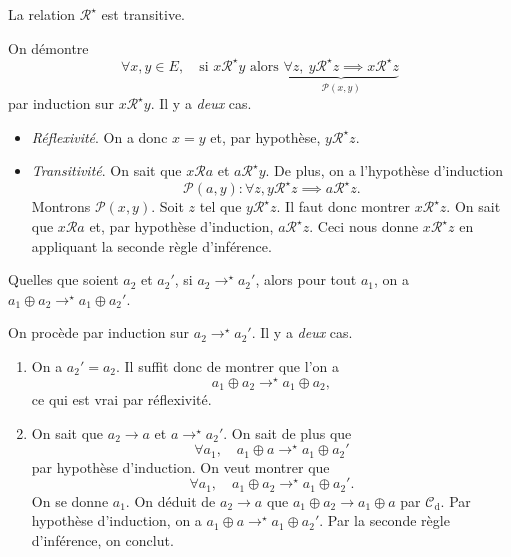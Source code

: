 \documentclass[../main]{subfiles}
\begin{document}
  \begin{lem}\label{lem:petit-pas-trans-transitif}
    La relation $\mathcal{R}^\star$ est transitive.
  \end{lem}
  \begin{prv}
    On démontre \[
      \forall x,y \in E, \quad \text{si } x \mathrel{\mathcal{R}^\star} y \text{ alors } \underbrace{\forall z, \ y \mathrel{\mathcal{R}^\star} z \implies x \mathrel{\mathcal{R}^\star} z}_{\mathcal{P}(x,y)}
    \] par induction sur $x \mathrel{\mathcal{R}^\star} y$.
    Il y a \textit{deux} cas.
    \begin{itemize}
      \item \textsl{Réflexivité}. On a donc $x = y$ et, par hypothèse, $y \mathrel{\mathcal{R}^\star} z$.
      \item \textsl{Transitivité}.
        On sait que $x \mathrel{\mathcal{R}} a$ et $a \mathrel{\mathcal{R}^\star} y$.
        De plus, on a l'hypothèse d'induction \[\mathcal{P}(a,y) : \forall z, y \mathrel{\mathcal{R}^\star} z \implies a \mathrel{\mathcal{R}^\star} z.\]
        Montrons $\mathcal{P}(x,y)$.
        Soit $z$ tel que $y \mathrel{\mathcal{R}^\star} z$. Il faut donc montrer $x \mathrel{\mathcal{R}^\star} z$.
        On sait que $x \mathrel{\mathcal{R}} a$ et, par hypothèse d'induction, $a \mathrel{\mathcal{R}^\star} z$.
        Ceci nous donne $x \mathrel{\mathcal{R}^\star} z$ en appliquant la seconde règle d'inférence.
    \end{itemize}
  \end{prv}

  \begin{lem} \label{lem:petit-pas-trans-compose}
    Quelles que soient $a_2$ et $a_2'$, si $a_2 \to^\star a_2'$, alors pour tout $a_1$, on a $a_1 \oplus a_2 \to^\star a_1 \oplus a_2'$.
  \end{lem}
  \begin{prv}
    On procède par induction sur $a_2 \to^\star a_2'$.
    Il y a \textit{deux} cas.
    \begin{enumerate}
      \item On a $a_2' = a_2$.
        Il suffit donc de montrer que l'on a \[a_1 \oplus a_2 \to^\star a_1 \oplus a_2,\] ce qui est vrai par réflexivité.
      \item On sait que $a_2 \to a$ et $a \to^\star a_2'$.
        On sait de plus que \[
        \forall a_1, \quad a_1 \oplus a \to^\star a_1 \oplus a_2'
        \] par hypothèse d'induction.
        On veut montrer que \[
        \forall a_1, \quad a_1 \oplus a_2 \to^\star a_1 \oplus a_2'
        .\]
        On se donne $a_1$.
        On déduit de $a_2 \to a$ que $a_1 \oplus a_2 \to a_1 \oplus a$ par $\mathcal{C}_\mathrm{d}$.
        Par hypothèse d'induction, on a $a_1 \oplus a \to^\star a_1 \oplus a_2'$.
        Par la seconde règle d'inférence, on conclut.
    \end{enumerate}
  \end{prv}
\end{document}
